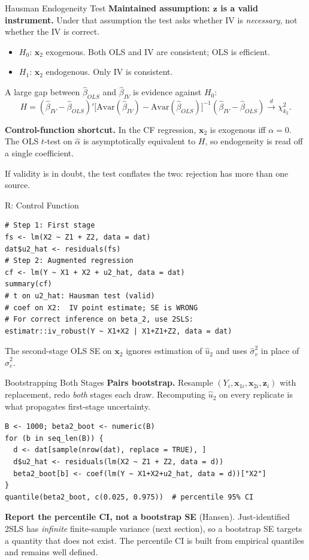 \documentclass[aspectratio=169, handout]{beamer}
\numberwithin{equation}{section}
\begin{document}
\begin{frame}{Hausman Endogeneity Test}
\textbf{Maintained assumption: $\bm{z}$ is a valid instrument.}  Under that assumption the test asks whether IV is \emph{necessary}, not whether the IV is correct.
\begin{itemize}
\item $H_0$: $\bm{x}_2$ exogenous.  Both OLS and IV are consistent; OLS is efficient.
\item $H_1$: $\bm{x}_2$ endogenous.  Only IV is consistent.
\end{itemize}
A large gap between $\hat{\beta}_{OLS}$ and $\hat{\beta}_{IV}$ is evidence against $H_0$:
$$H=(\hat{\beta}_{IV}-\hat{\beta}_{OLS})'\bigl[\text{Avar}(\hat{\beta}_{IV})-\text{Avar}(\hat{\beta}_{OLS})\bigr]^{-1}(\hat{\beta}_{IV}-\hat{\beta}_{OLS})\xrightarrow{d}\chi^2_{k_2}.$$

\medskip
\textbf{Control-function shortcut.}  In the CF regression, $\bm{x}_2$ is exogenous iff $\alpha=0$.  The OLS $t$-test on $\hat{\alpha}$ is asymptotically equivalent to $H$, so endogeneity is read off a single coefficient.

\medskip
\alert{If validity is in doubt, the test conflates the two: rejection has more than one source.}
\end{frame}


\begin{frame}[fragile]{R: Control Function}
\begin{lstlisting}
# Step 1: First stage
fs <- lm(X2 ~ Z1 + Z2, data = dat)
dat$u2_hat <- residuals(fs)
# Step 2: Augmented regression
cf <- lm(Y ~ X1 + X2 + u2_hat, data = dat)
summary(cf)
# t on u2_hat: Hausman test (valid)
# coef on X2:  IV point estimate; SE is WRONG
# For correct inference on beta_2, use 2SLS:
estimatr::iv_robust(Y ~ X1+X2 | X1+Z1+Z2, data = dat)
\end{lstlisting}
\small The second-stage OLS SE on $\bm{x}_2$ ignores estimation of $\hat{u}_2$ and uses $\hat{\sigma}_v^2$ in place of $\hat{\sigma}_e^2$.
\end{frame}


\begin{frame}[fragile]{Bootstrapping Both Stages}
\textbf{Pairs bootstrap.}  Resample $(Y_i, \bm{x}_{1i}, \bm{x}_{2i}, \bm{z}_i)$ with replacement, redo \emph{both} stages each draw.  Recomputing $\hat{u}_2$ on every replicate is what propagates first-stage uncertainty.
\begin{lstlisting}
B <- 1000; beta2_boot <- numeric(B)
for (b in seq_len(B)) {
  d <- dat[sample(nrow(dat), replace = TRUE), ]
  d$u2_hat <- residuals(lm(X2 ~ Z1 + Z2, data = d))
  beta2_boot[b] <- coef(lm(Y ~ X1+X2+u2_hat, data = d))["X2"]
}
quantile(beta2_boot, c(0.025, 0.975))  # percentile 95% CI
\end{lstlisting}
\small \textbf{Report the percentile CI, not a bootstrap SE} (Hansen).  Just-identified 2SLS has \emph{infinite} finite-sample variance (next section), so a bootstrap SE targets a quantity that does not exist.  The percentile CI is built from empirical quantiles and remains well defined.
\end{frame}
\end{document}
